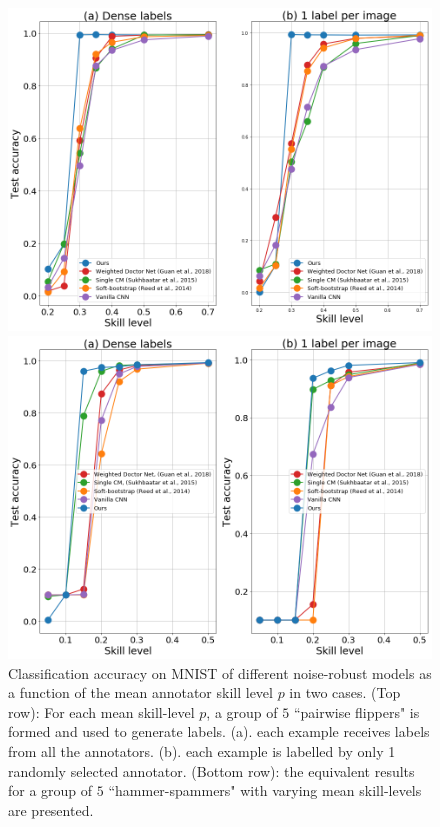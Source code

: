 \begin{figure}[ht!]
	\begin{center}
		\includegraphics[width=0.8\linewidth]{chapter_4/figures/figures_new/figure_6.png}
	\end{center}
	\begin{center}
		\includegraphics[width=0.8\linewidth]{chapter_4/figures/figures_new/figure_03.png}
	\end{center}
	\vspace{-2mm}
	
	\caption{\small Classification accuracy on MNIST of different noise-robust models as a function of the mean annotator skill level $p$ in two cases. (Top row): For each mean skill-level $p$, a group of $5$ ``pairwise flippers" is formed and used to generate labels. (a). each example receives labels from all the annotators. (b). each example is labelled by only 1 randomly selected annotator. (Bottom row): the equivalent results for a group of $5$ ``hammer-spammers" with varying mean skill-levels are presented. }
	\label{fig:accuracy_vs_noise_levels}
	\vspace{-4mm}
\end{figure}

